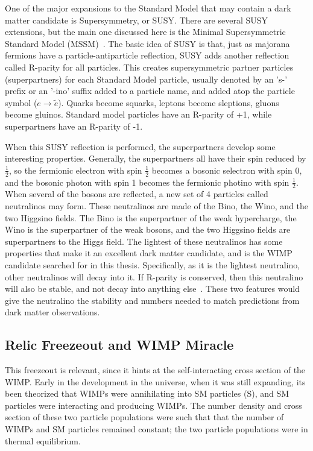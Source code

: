   One of the major expansions to the Standard Model that may contain a dark matter candidate is Supersymmetry, or SUSY.
  There are several SUSY extensions, but the main one discussed here is the Minimal Supersymmetric Standard Model (MSSM)~\cite{MSSM,supersym1}.
  The basic idea of SUSY is that, just as majorana fermions have a particle-antiparticle reflection, SUSY adds another reflection called R-parity for all particles. 
  This creates supersymmetric partner particles (superpartners) for each Standard Model particle, usually denoted by an 's-' prefix or an '-ino' suffix added to a particle name, and \nicetilde{} added atop the particle symbol ($e \rightarrow \tilde{e}$).
  Quarks become squarks, leptons become sleptions, gluons become gluinos.
  Standard model particles have an R-parity of +1, while superpartners have an R-parity of -1.
    
  When this SUSY reflection is performed, the superpartners develop some interesting properties.
  Generally, the superpartners all have their spin reduced by $\frac{1}{2}$, so the fermionic electron with spin $\frac{1}{2}$ becomes a bosonic selectron with spin $0$, and the bosonic photon with spin 1 becomes the fermionic photino with spin $\frac{1}{2}$.
  When several of the bosons are reflected, a new set of 4 particles called neutralinos may form.
  These neutralinos are made of the Bino, the Wino, and the two Higgsino fields.
  The Bino is the superpartner of the weak hypercharge, the Wino is the superpartner of the weak bosons, and the two Higgsino fields are superpartners to the Higgs field.
  The lightest of these neutralinos has some properties that make it an excellent dark matter candidate, and is the WIMP candidate searched for in this thesis.
  Specifically, as it is the lightest neutralino, other neutralinos will decay into it.
  If R-parity is conserved, then this neutralino will also be stable, and not decay into anything else~\cite{neutralino1,neutralino2,neutralino3}.
  These two features would give the neutralino the stability and numbers needed to match predictions from dark matter observations.
  
  \subsection{Relic Freezeout and WIMP Miracle}
  
  
  This freezeout is relevant, since it hints at the self-interacting cross section of the WIMP.
  Early in the development in the universe, when it was still expanding, its been theorized that WIMPs were annihilating into SM particles (S), and SM particles were interacting and producing WIMPs.
  The number density and cross section of these two particle populations were such that that the number of WIMPs and SM particles remained constant; the two particle populations were in thermal equilibrium.
  
